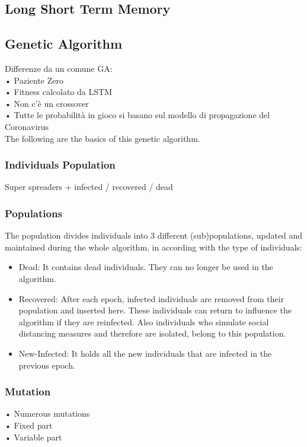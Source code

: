 \documentclass[letterpaper]{article}%
\begin{document}
\subsection{Long Short Term Memory}
\subsection{Genetic Algorithm}
Differenze da un comune GA:\\
• Paziente Zero\\
• Fitness calcolato da LSTM\\
• Non c’è un crossover\\
• Tutte le probabilità in gioco si basano sul modello di propagazione del Coronavirus\\

The following are the basics of this genetic algorithm.\\
\subsubsection{Individuals Population}
Super spreaders + infected / recovered / dead\\

\subsubsection{Populations}
The population divides individuals into 3 different (sub)populations, updated and maintained during the whole algorithm, in according with the type of individuals:
\begin{itemize}
\item Dead: It contains dead individuals. They can no longer be used in the algorithm.
\item Recovered: After each epoch, infected individuals are removed from their population and inserted here. These individuals can return to influence the algorithm if they are reinfected. Also individuals who simulate social distancing measures and therefore are isolated, belong to this population.
\item New-Infected: It holds all the new individuals that are infected in the previous epoch.
\end{itemize}

\subsubsection{Mutation}
• Numerous mutations\\
• Fixed part\\
• Variable part\\
\end{document}
